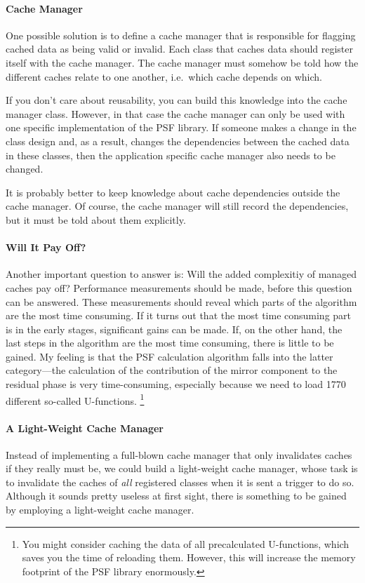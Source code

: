 \documentclass[a4paper]{article}
\begin{document}
\paragraph{Cache Manager}
One possible solution is to define a cache manager that is responsible for
flagging cached data as being valid or invalid. Each class that caches data
should register itself with the cache manager. The cache manager must somehow
be told how the different caches relate to one another, i.e.\ which cache
depends on which.

If you don't care about reusability, you can build this knowledge into the
cache manager class. However, in that case the cache manager can only be used
with one specific implementation of the PSF library. If someone makes a
change in the class design and, as a result, changes the dependencies between
the cached data in these classes, then the application specific cache manager
also needs to be changed.

It is probably better to keep knowledge about cache dependencies outside the
cache manager. Of course, the cache manager will still record the
dependencies, but it must be told about them explicitly.

\paragraph{Will It Pay Off?}
Another important question to answer is: Will the added complexitiy of managed
caches pay off? Performance measurements should be made, before this question
can be answered. These measurements should reveal which parts of the algorithm
are the most time consuming. If it turns out that the most time consuming part
is in the early stages, significant gains can be made. If, on the other hand,
the last steps in the algorithm are the most time consuming, there is little
to be gained. My feeling is that the PSF calculation algorithm falls into the
latter category---the calculation of the contribution of the mirror component
to the residual phase is very time-consuming, especially because we need to
load 1770 different so-called U-functions.%
\footnote{You might consider caching the data of all precalculated
U-functions, which saves you the time of reloading them. However, this
will increase the memory footprint of the PSF library enormously.}

\paragraph{A Light-Weight Cache Manager}
Instead of implementing a full-blown cache manager that only invalidates
caches if they really must be, we could build a light-weight cache manager,
whose task is to invalidate the caches of {\em all\/} registered classes when
it is sent a trigger to do so. Although it sounds pretty useless at first
sight, there is something to be gained by employing a light-weight cache
manager.
\end{document}
